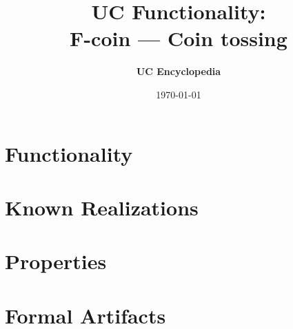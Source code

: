 \documentclass[11pt,a4paper]{article}
\title{\textbf{\Large UC Functionality:}\\[0.2em] \Large F-coin --- Coin tossing}
\author{\textbf{UC Encyclopedia}}
\date{\today}
\newtheorem{functionality}{Functionality}
\begin{document}
\maketitle

\begin{abstract}
\end{abstract}

\section{Functionality}

%

\section{Known Realizations}


\section{Properties}


\section{Formal Artifacts}

\end{document}
